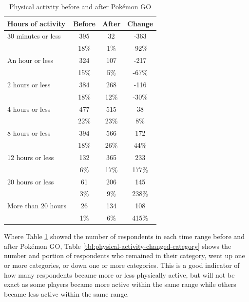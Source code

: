 \begin{table}[h]
	\centering
	\caption{Physical activity before and after Pokémon GO}
	\label{tbl:physical-activity-before-and-after}
	\begin{tabular}{|l|c|c|c|}
		\hline
		\textbf{Hours of activity} & \textbf{Before} & \textbf{After} & \textbf{Change} \\\hline\hline
		30 minutes or less	& 395 & 32 & -363\\
							& 18\% & 1\% & -92\%\\\hline
		An hour or less & 324 & 107 & -217\\
						& 15\% & 5\% & -67\%\\\hline
		2 hours or less & 384 & 268 & -116\\
						& 18\% & 12\% & -30\%\\\hline
		4 hours or less & 477 & 515 & 38\\
						& 22\% & 23\% & 8\%\\\hline
		8 hours or less & 394 & 566 & 172\\
						& 18\% & 26\% & 44\%\\\hline
		12 hours or less	& 132 & 365 & 233\\
							& 6\% & 17\% & 177\%\\\hline
		20 hours or less	& 61 & 206 & 145\\
							& 3\% & 9\% & 238\%\\\hline
		More than 20 hours	& 26 & 134 & 108\\
							& 1\% & 6\% & 415\%\\\hline
	\end{tabular}
\end{table}

Where Table \ref{tbl:physical-activity-before-and-after} showed the number of respondents in each time range before and after Pokémon GO, Table \ref{tbl:physical-activity-changed-category} shows the number and portion of respondents who remained in their category, went up one or more categories, or down one or more categories. This is a good indicator of how many respondents became more or less physically active, but will not be exact as some players became more active within the same range while others became less active within the same range. 

